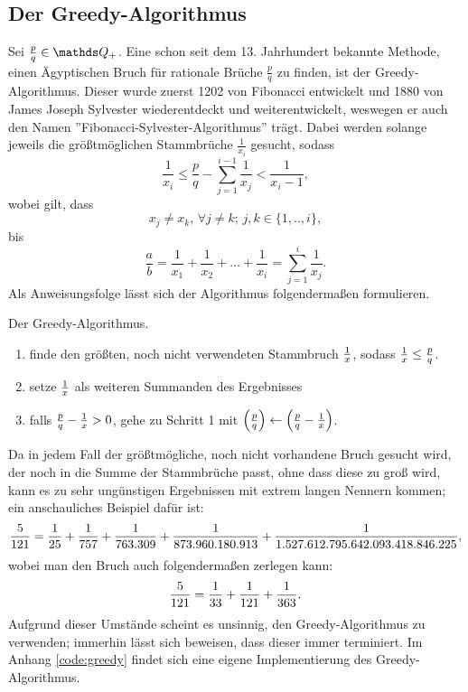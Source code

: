 \subsection{Der Greedy-Algorithmus}
Sei $\frac{p}{q} \in \Q_+$. Eine schon seit dem 13. Jahrhundert bekannte Methode, einen Ägyptischen Bruch für rationale Brüche $\frac{p}{q}$ zu finden, ist der Greedy-Algorithmus. Dieser wurde zuerst 1202 von Fibonacci entwickelt und 1880 von James Joseph Sylvester wiederentdeckt und weiterentwickelt, weswegen er auch den Namen ''Fibonacci-Sylvester-Algorithmus'' trägt. Dabei werden solange jeweils die größtmöglichen Stammbrüche $\frac{1}{x_i}$ gesucht, sodass
\begin{equation}\label{eq:greedy_fracNorm}
\frac{1}{x_i} \leq \frac{p}{q} - \sum_{j=1}^{i-1} \frac{1}{x_j} < \frac{1}{x_{i}-1},
\end{equation}
wobei gilt, dass
$$x_j \neq x_k,\, \forall j \neq k;\, j,k \in \{1,..,i\},$$ 
bis
$$\frac{a}{b} = \frac{1}{x_1} + \frac{1}{x_2} + ... + \frac{1}{x_i} = \sum_{j=1}^{i} \frac{1}{x_j}.$$
Als Anweisungsfolge lässt sich der Algorithmus folgendermaßen formulieren.
\begin{algorithm}\label{algo:greedy}
	Der Greedy-Algorithmus.
	\begin{enumerate}
		\item finde den größten, noch nicht verwendeten Stammbruch $\frac{1}{x}$, sodass $\frac{1}{x} \leq \frac{p}{q}$.
		\item setze $\frac{1}{x}$ als weiteren Summanden des Ergebnisses
		\item falls $\frac{p}{q} - \frac{1}{x} > 0$, gehe zu Schritt 1 mit $\left(\frac{p}{q}\right) \leftarrow \left(\frac{p}{q}-\frac{1}{x}\right)$.
	\end{enumerate}
\end{algorithm}

Da in jedem Fall der größtmögliche, noch nicht vorhandene Bruch gesucht wird, der noch in die Summe der Stammbrüche passt, ohne dass diese zu groß wird, kann es zu sehr ungünstigen Ergebnissen mit extrem langen Nennern kommen; ein anschauliches Beispiel dafür ist:
$$\frac{5}{121} = \frac{1}{25} + \frac{1}{757} + \frac{1}{763.309} + \frac{1}{873.960.180.913} + \frac{1}{1.527.612.795.642.093.418.846.225},$$
wobei man den Bruch auch folgendermaßen zerlegen kann:
$$\frac{5}{121} = \frac{1}{33} + \frac{1}{121} + \frac{1}{363}.$$
Aufgrund dieser Umstände scheint es unsinnig, den Greedy-Algorithmus zu verwenden; immerhin lässt sich beweisen, dass dieser immer terminiert.
Im Anhang \ref{code:greedy} findet sich eine eigene Implementierung des Greedy-Algorithmus.

